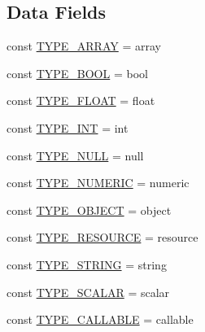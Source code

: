 \subsection*{Data Fields}
\begin{DoxyCompactItemize}
\item 
const \mbox{\hyperlink{class_p_h_p_unit___framework___constraint___is_type_a11563c517f16ce832ff4fed40928a12b}{T\+Y\+P\+E\+\_\+\+A\+R\+R\+AY}} = \textquotesingle{}array\textquotesingle{}
\item 
const \mbox{\hyperlink{class_p_h_p_unit___framework___constraint___is_type_a2008e61ac981f88cf7a8218c600077f5}{T\+Y\+P\+E\+\_\+\+B\+O\+OL}} = \textquotesingle{}bool\textquotesingle{}
\item 
const \mbox{\hyperlink{class_p_h_p_unit___framework___constraint___is_type_ac003ec4c6b6ce8edbcb1f3fff0a3a38f}{T\+Y\+P\+E\+\_\+\+F\+L\+O\+AT}} = \textquotesingle{}float\textquotesingle{}
\item 
const \mbox{\hyperlink{class_p_h_p_unit___framework___constraint___is_type_a99c083a2611abba224ce8a0aa7c7885d}{T\+Y\+P\+E\+\_\+\+I\+NT}} = \textquotesingle{}int\textquotesingle{}
\item 
const \mbox{\hyperlink{class_p_h_p_unit___framework___constraint___is_type_a5e1f66f767bfb7293469d627772da2bb}{T\+Y\+P\+E\+\_\+\+N\+U\+LL}} = \textquotesingle{}null\textquotesingle{}
\item 
const \mbox{\hyperlink{class_p_h_p_unit___framework___constraint___is_type_a05506caa66752aa1b4d1be8fdba80095}{T\+Y\+P\+E\+\_\+\+N\+U\+M\+E\+R\+IC}} = \textquotesingle{}numeric\textquotesingle{}
\item 
const \mbox{\hyperlink{class_p_h_p_unit___framework___constraint___is_type_a2365fd1fb1e6d6e994238955ce32a8ec}{T\+Y\+P\+E\+\_\+\+O\+B\+J\+E\+CT}} = \textquotesingle{}object\textquotesingle{}
\item 
const \mbox{\hyperlink{class_p_h_p_unit___framework___constraint___is_type_ad07ab1c1105bca21101d66c32159b192}{T\+Y\+P\+E\+\_\+\+R\+E\+S\+O\+U\+R\+CE}} = \textquotesingle{}resource\textquotesingle{}
\item 
const \mbox{\hyperlink{class_p_h_p_unit___framework___constraint___is_type_a7b176bd55450d1c25a421b13dd484b4e}{T\+Y\+P\+E\+\_\+\+S\+T\+R\+I\+NG}} = \textquotesingle{}string\textquotesingle{}
\item 
const \mbox{\hyperlink{class_p_h_p_unit___framework___constraint___is_type_a40e11b5ee4ea95b924f0c0b6d37809dc}{T\+Y\+P\+E\+\_\+\+S\+C\+A\+L\+AR}} = \textquotesingle{}scalar\textquotesingle{}
\item 
const \mbox{\hyperlink{class_p_h_p_unit___framework___constraint___is_type_a0a2c1f3ba4b81c0938122ff4e88764f8}{T\+Y\+P\+E\+\_\+\+C\+A\+L\+L\+A\+B\+LE}} = \textquotesingle{}callable\textquotesingle{}
\end{DoxyCompactItemize}
